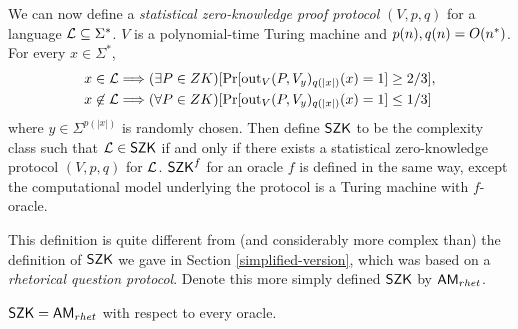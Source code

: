   We can now define a \textit{statistical zero-knowledge proof protocol}
  $(V,p,q)$ for a language $\mathcal{L}\subseteq\Sigma^*$. $V$ is a polynomial-time
  Turing machine and $p(n),q(n)=O(n^*)$. For every $x\in\Sigma^*$,
  \begin{align*}
  x\in\mathcal{L}&\Longrightarrow(\exists P\in ZK)
  [\Pr[\operatorname{out}_V(P,V_y)_{q(|x|)}(x)=1]\geq 2/3], \\
  x\not\in\mathcal{L}&\Longrightarrow(\forall P\in ZK)
  [\Pr[\operatorname{out}_V(P,V_y)_{q(|x|)}(x)=1]\leq 1/3]
  \end{align*}
  where $y\in\Sigma^{p(|x|)}$ is randomly chosen.
  Then define $\mathsf{SZK}$ to be the complexity class such that $\mathcal{L}\in\mathsf{SZK}$
  if and only if there exists a statistical zero-knowledge protocol $(V,p,q)$
  for $\mathcal{L}$. $\mathsf{SZK}^f$ for an oracle $f$ is defined in the same way, except
  the computational model underlying the protocol is a Turing machine with
  $f$-oracle.
  
This definition is quite different from (and considerably more complex than) the 
definition of $\mathsf{SZK}$ we gave in Section \ref{simplified-version}, which was 
based on a \textit{rhetorical question protocol}. Denote this more simply defined 
$\mathsf{SZK}$ by $\mathsf{AM}_{rhet}$.

\begin{theorem}[Kuperberg]
$\mathsf{SZK}=\mathsf{AM}_{rhet}$ with respect to every oracle.
\end{theorem}

